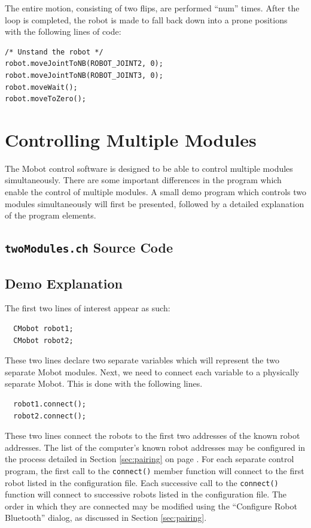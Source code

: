 \documentclass{article}
\begin{document}
The entire motion, consisting of two flips, are performed ``num'' times. After
the loop is completed, the robot is made to fall back down into a prone
positions with the following lines of code:
\begin{verbatim}
/* Unstand the robot */
robot.moveJointToNB(ROBOT_JOINT2, 0);
robot.moveJointToNB(ROBOT_JOINT3, 0);
robot.moveWait();
robot.moveToZero();
\end{verbatim}


\section{Controlling Multiple Modules}
The Mobot control software is designed to be able to control multiple modules
simultaneously. There are some important differences in the program 
which enable the control of multiple modules. A small demo program which
controls two modules simultaneously will first be presented, followed by
a detailed explanation of the program elements.

\subsection{\texttt{twoModules.ch} Source Code}


\subsection{Demo Explanation}
The first two lines of interest appear as such:
\begin{verbatim}
  CMobot robot1;
  CMobot robot2;
\end{verbatim}
These two lines declare two separate variables which will represent the
two separate Mobot modules. Next, we need to connect each variable to
a physically separate Mobot. This is done with the following lines.
\begin{verbatim}
  robot1.connect();
  robot2.connect();
\end{verbatim}
These two lines connect the robots to the first two addresses
of the known robot addresses. The list of the computer's known
robot addresses may be configured in the process detailed in Section
\ref{sec:pairing} on page \pageref{sec:pairing}. For each separate
control program, the first call to the \texttt{connect()} member
function will connect to the first robot listed in the configuration
file. Each successive call to the \texttt{connect()} function will
connect to successive robots listed in the configuration file. 
The order in which they are connected may be modified using the
``Configure Robot Bluetooth'' dialog, as discussed in Section
\ref{sec:pairing}.
\end{document}
